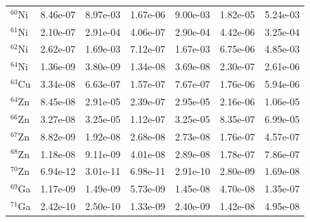 \begin{table}
\begin{tabular}{l|cc|cc|cc}
$^{60}$Ni & 8.46e-07 & 8.97e-03 & 1.67e-06 & 9.00e-03 & 1.82e-05 & 5.24e-03\\
$^{61}$Ni & 2.10e-07 & 2.91e-04 & 4.06e-07 & 2.90e-04 & 4.42e-06 & 3.25e-04\\
$^{62}$Ni & 2.62e-07 & 1.69e-03 & 7.12e-07 & 1.67e-03 & 6.75e-06 & 4.85e-03\\
$^{64}$Ni & 1.36e-09 & 3.80e-09 & 1.34e-08 & 3.69e-08 & 2.30e-07 & 2.61e-06\\
$^{63}$Cu & 3.34e-08 & 6.63e-07 & 1.57e-07 & 7.67e-07 & 1.76e-06 & 5.94e-06\\
$^{64}$Zn & 8.45e-08 & 2.91e-05 & 2.39e-07 & 2.95e-05 & 2.16e-06 & 1.06e-05\\
$^{66}$Zn & 3.27e-08 & 3.25e-05 & 1.12e-07 & 3.25e-05 & 8.35e-07 & 6.99e-05\\
$^{67}$Zn & 8.82e-09 & 1.92e-08 & 2.68e-08 & 2.73e-08 & 1.76e-07 & 4.57e-07\\
$^{68}$Zn & 1.18e-08 & 9.11e-09 & 4.01e-08 & 2.89e-08 & 1.78e-07 & 7.86e-07\\
$^{70}$Zn & 6.94e-12 & 3.01e-11 & 6.98e-11 & 2.91e-10 & 2.80e-09 & 1.69e-08\\
$^{69}$Ga & 1.17e-09 & 1.49e-09 & 5.73e-09 & 1.45e-08 & 4.70e-08 & 1.35e-07\\
$^{71}$Ga & 2.42e-10 & 2.50e-10 & 1.33e-09 & 2.40e-09 & 1.42e-08 & 4.95e-08\\
\hline
\end{tabular}
\end{table}
\newpage


